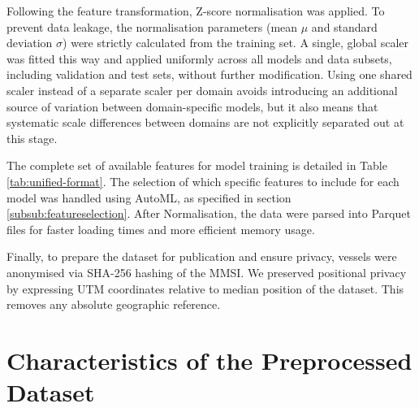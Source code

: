 Following the feature transformation, Z-score normalisation was applied.
To prevent data leakage, the normalisation parameters (mean $\mu$ and standard deviation $\sigma$) were strictly calculated from the training set. %
A single, global scaler was fitted this way and applied uniformly across all models and data subsets, including validation and test sets, without further modification. %
Using one shared scaler instead of a separate scaler per domain avoids introducing an additional source of variation between domain-specific models, but it also means that systematic scale differences between domains are not explicitly separated out at this stage.

The complete set of available features for model training is detailed in Table \ref{tab:unified-format}. The selection of which specific features to include for each model was handled %
using \ac{AutoML}, as specified in section \ref{subsub:featureselection}.
After Normalisation, the data were parsed into Parquet files for faster loading times and more efficient memory usage.

Finally, to prepare the dataset for publication and ensure privacy, vessels were anonymised via SHA-256 hashing of the \ac{MMSI}. 
We preserved positional privacy by expressing \acs{UTM} coordinates relative to median position of the dataset. 
This removes any absolute geographic reference.

\section[Dataset Characteristics]{Characteristics of the Preprocessed Dataset}%
\label{sec:dataset_characteristics}

